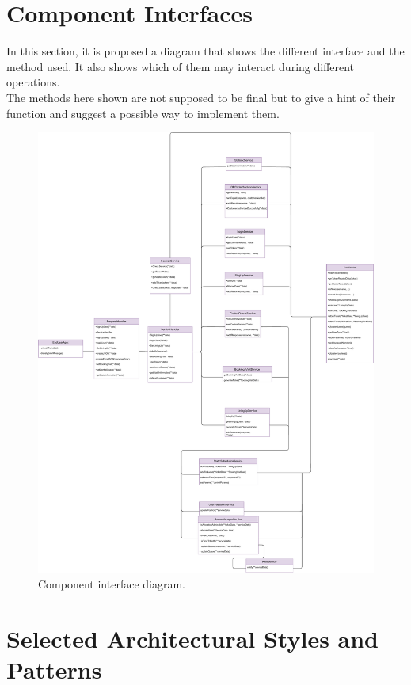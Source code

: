 \section{Component Interfaces}
In this section, it is proposed a diagram that shows the different interface and the method used. It also shows which of them may interact during different operations. \\
The methods here shown are not supposed to be final but to give a hint of their function and suggest a possible way to implement them.
\begin{figure}[H]
    \centering
    \includegraphics[width=1.0\textwidth]{images/Component_class_diagram.pdf}
    \caption{Component interface diagram.}\label{fig:Component interface diagram}
\end{figure}


\section{Selected Architectural Styles and Patterns}


